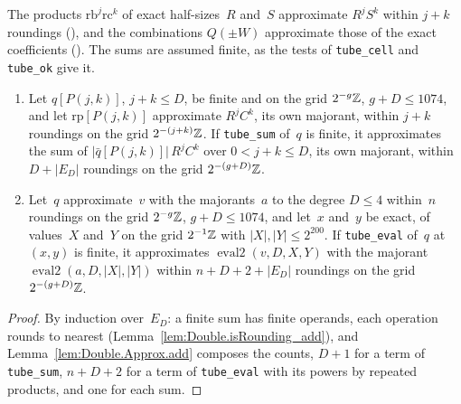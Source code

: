 The products $\mathrm{rb}^j \mathrm{rc}^k$ of exact half-sizes~$R$ and~$S$ approximate $R^j S^k$
within $j + k$ roundings (), and the
combinations $Q(\pm W)$ approximate those of the exact coefficients
(). The sums are assumed finite, as the tests of
\texttt{tube\_cell} and \texttt{tube\_ok} give it.

\begin{lemma}\label{lem:Double.approx_tubeSumGen}
  \leanok
  \begin{enumerate}
    \item Let $q[P(j, k)]$, $j + k \le D$, be finite and on the grid $2^{-g}\mathbb{Z}$, $g + D \le 1074$,
      and let $\mathrm{rp}[P(j, k)]$ approximate $R^j C^k$, its own majorant, within $j + k$
      roundings on the grid $2^{-(j + k)}\mathbb{Z}$. If \texttt{tube\_sum} of~$q$ is finite, it
      approximates the sum of $|\bar q[P(j, k)]|\, R^j C^k$ over $0 < j + k \le D$, its own
      majorant, within $D + |E_D|$ roundings on the grid $2^{-(g + D)}\mathbb{Z}$.
    \item Let~$q$ approximate~$v$ with the majorants~$a$ to the degree $D \le 4$ within~$n$
      roundings on the grid $2^{-g}\mathbb{Z}$, $g + D \le 1074$, and let~$x$ and~$y$ be exact, of
      values~$X$ and~$Y$ on the grid $2^{-1}\mathbb{Z}$ with $|X|, |Y| \le 2^{200}$. If \texttt{tube\_eval}
      of~$q$ at $(x, y)$ is finite, it approximates $\operatorname{eval2}(v, D, X, Y)$ with the
      majorant $\operatorname{eval2}(a, D, |X|, |Y|)$ within $n + D + 2 + |E_D|$ roundings on the
      grid $2^{-(g + D)}\mathbb{Z}$.
  \end{enumerate}
\end{lemma}

\begin{proof}
  \leanok
  By induction over~$E_D$: a finite sum has finite operands, each operation rounds to nearest
  (Lemma~\ref{lem:Double.isRounding_add}), and Lemma~\ref{lem:Double.Approx.add} composes the
  counts, $D + 1$ for a term of \texttt{tube\_sum}, $n + D + 2$ for a term of \texttt{tube\_eval}
  with its powers by repeated products, and one for each sum.
\end{proof}


